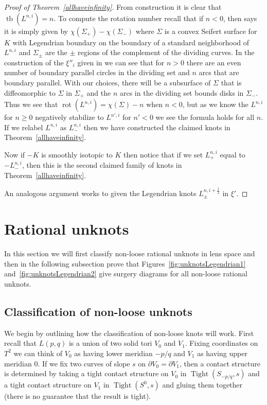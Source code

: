 \documentclass[11pt]{amsart}
\theoremstyle{plain}
\theoremstyle{definition}
\theoremstyle{remark}
\numberwithin{theorem}{section}
\DeclareMathOperator{\Tight}{Tight}
\DeclareMathOperator\tb{tb}                   %
\DeclareMathOperator\rot{rot}                 %
\begin{document}
\begin{proof}[Proof of Theorem~\ref{allhaveinfinity}]
From construction it is clear that $\tb(L^{n,i})=n$. To compute the rotation number recall that if $n<0$, then \cite{Kanda98} says it is simply given by $\chi(\Sigma_+)-\chi(\Sigma_-)$ where $\Sigma$ is a convex Seifert surface for $K$ with Legendrian boundary on the boundary of a standard neighborhood of $L^{n,i}$ and $\Sigma_\pm$ are the $\pm$ regions of the complement of the dividing curves. In the construction of the $\xi''_i$ given in \cite[Section~4]{HondaKazezMatic02} we can see that for $n>0$ there are an even number of boundary parallel circles in the dividing set and $n$ arcs that are boundary parallel. With our choices, there will be a subsurface of $\Sigma$ that is diffeomorphic to $\Sigma$ in $\Sigma_+$ and the $n$ arcs in the dividing set bounds disks in $\Sigma_-$. Thus we see that $\rot(L^{n,i})=\chi(\Sigma)-n$ when $n<0$, but as we know the $L^{n,i}$ for $n\geq 0$ negatively stabilize to $L^{n',i}$ for $n'<0$  we see the formula holds for all $n$.  If we relabel $L^{n,i}$ as $L_-^{n,i}$ then we have constructed the claimed knots in Theorem~\ref{allhaveinfinity}. 

Now if $-K$ is smoothly isotopic to $K$ then notice that if we set $L_+^{n,i}$ equal to $-L_-^{n,i}$, then this is the second claimed family of knots in Theorem~\ref{allhaveinfinity}.

An analogous argument works to given the Legendrian knots $L_\pm^{n,i+\frac 12}$ in $\xi'$. 
\end{proof}

\section{Rational unknots}\label{sec:ruk}
In this section we will first classify non-loose rational unknots in lens space and then in the following subsection prove that Figures~\ref{fig:unknotsLegendrian1} and~\ref{fig:unknotsLegendrian2} give surgery diagrams for all non-loose rational unknots. 

\subsection{Classification of non-loose unknots}
We begin by outlining how the classification of non-loose knots will work. First recall that $L(p,q)$ is a union of two solid tori $V_0$ and $V_1$. Fixing coordinates on $T^2$ we can think of $V_0$ as having lower meridian $-p/q$ and $V_1$ as having upper meridian $0$. If we fix two curves of slope $s$ on $\partial V_0=\partial V_1$, then a contact structure is determined by taking a tight contact structure on $V_0$ in $\Tight(S_{-p/q},s)$ and a tight contact structure on $V_1$ in $\Tight(S^0,s)$ and gluing them together (there is no guarantee that the result is tight). 
\end{document}
